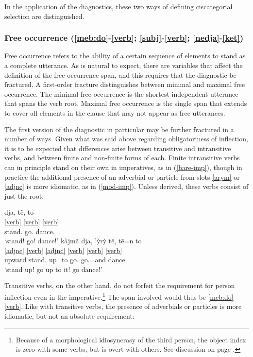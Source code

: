 \documentclass[output=paper]{langscibook}
\begin{document}

In the application of the diagnostics, these two ways of defining ciscategorial selection are distinguished.

\subsubsection{Free occurrence (\ref{meb:do}-\ref{verb}; \ref{subj}-\ref{verb}; \ref{nedja}-\ref{ket})}
Free occurrence refers to the ability of a certain sequence of elements to stand as a complete utterance. As is natural to expect, there are variables that affect the definition of the free occurrence span, and this requires that the diagnostic be fractured. A first-order fracture distinguishes between minimal and maximal free occurrence. The minimal free occurrence is the shortest independent utterance that spans the verb root. Maximal free occurrence is the single span that extends to cover all elements in the clause that may not appear as free utterances.

The first version of the diagnostic in particular may be further fractured in a number of ways. Given what was said above regarding obligatoriness of inflection, it is to be expected that differences arise between transitive and intransitive verbs, and between finite and non-finite forms of each. Finite intransitive verbs can in principle stand on their own in imperatives, as in (\ref{bare-imp}), though in practice the additional presence of an adverbial or particle from slots \ref{arym} or \ref{adjnc} is more idiomatic, as in (\ref{mod-imp}). Unless derived, these verbs consist of just the root.

\ea
    \ea\label{bare-imp}\glll dja, tẽ, to\\
      \ref{verb} \ref{verb} \ref{verb}\\
        stand.\Fin{} go.\Fin{} dance.\Fin{}\\
      \glt `stand! go! dance!'
    \ex\label{mod-imp}\glll kàjmã dja, 'ỳrỳ tẽ, tẽ=n to\\
                \ref{adjnc} \ref{verb} \ref{adjnc} \ref{verb} \ref{verb} \ref{verb}\\
                upward stand.\Fin{} up\_to go.\Fin{} go.\Fin{}=and dance.\Fin{}\\
            \glt `stand up! go up to it! go dance!'
    \z
\z

Transitive verbs, on the other hand, do not forfeit the requirement for person inflection even in the imperative.\footnote{Because of a morphological idiosyncrasy of the third person, the object index is zero with some verbs, but is overt with others. See discussion on page \pageref{relationality}.} The span involved would thus be \ref{meb:do}-\ref{verb}. Like with transitive verbs, the presence of adverbials or particles is more idiomatic, but not an absolute requirement:
\end{document}
